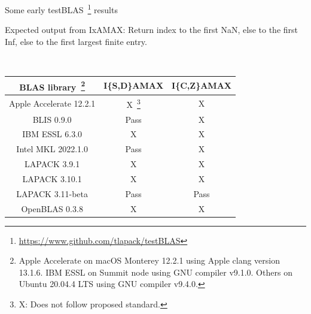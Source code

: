 \documentclass[11pt]{beamer}
\begin{document}
\begin{frame}{Some early testBLAS~\footnote{\url{https://www.github.com/tlapack/testBLAS}} results}

	Expected output from IxAMAX: Return index to the first NaN, else to the first Inf, else to the first largest finite entry.

	~\\
		\centering
		\begin{tabular}{|c|c|c|}
			\hline
			BLAS library~\footnote{Apple Accelerate on macOS Monterey 12.2.1 using Apple clang version 13.1.6. IBM ESSL on Summit node using GNU compiler v9.1.0. Others on Ubuntu 20.04.4 LTS using GNU compiler v9.4.0.} & I\{S,D\}AMAX & I\{C,Z\}AMAX \\\hline
			Apple Accelerate 12.2.1 & {X~\footnote{X: Does not follow proposed standard.}} & {X} \\\hline
			BLIS 0.9.0 & {\color{codegreen} Pass} & {X} \\\hline
			IBM ESSL 6.3.0 & {X} & {X} \\\hline
			Intel MKL 2022.1.0 & {\color{codegreen} Pass} & {X} \\\hline
			LAPACK 3.9.1 & {X} & {X} \\\hline
			LAPACK 3.10.1 & {X} & {X} \\\hline
			LAPACK 3.11-beta & {\color{codegreen} Pass} & {\color{codegreen} Pass} \\\hline
			OpenBLAS 0.3.8 & {X} & {X} \\\hline
		\end{tabular}

\end{frame}
\end{document}
